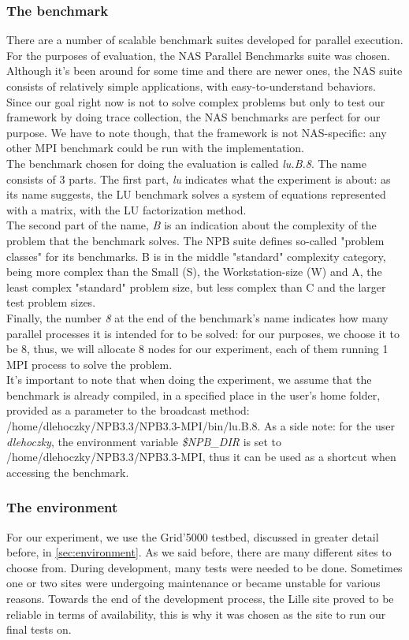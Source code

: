 \subsubsection{The benchmark}
There are a number of scalable benchmark suites developed for parallel
execution. For the purposes of evaluation, the NAS Parallel Benchmarks
suite\cite{jfy99} was chosen. Although it's been around for some time
and there are newer ones, the NAS suite consists of relatively simple
applications, with easy-to-understand behaviors. Since our goal right
now is not to solve complex problems but only to test our framework by
doing trace collection, the NAS benchmarks are perfect for our
purpose. We have to note though, that the framework is not
NAS-specific: any other MPI benchmark could be run with the
implementation.\\[0.3cm]
The benchmark chosen for doing the evaluation is
called \emph{lu.B.8}. The name consists of 3 parts. The first
part, \emph{lu} indicates what the experiment is about: as its name
suggests, the LU benchmark solves a system of equations represented
with a matrix, with the LU factorization method.\\[0.3cm]
The second part of the name, \emph{B} is an
indication about the complexity of the problem that the benchmark
solves. The NPB suite defines so-called "problem classes" for its
benchmarks. B is in the middle "standard" complexity category, being
more complex than the Small (S), the Workstation-size (W) and A, the
least complex "standard" problem size, but less complex than C and the
larger test problem sizes.\cite{d13}\\[0.3cm]
Finally, the number \emph{8} at the end of the benchmark's name
indicates how many parallel processes it is intended for to be solved:
for our purposes, we choose it to be 8, thus, we will allocate 8 nodes
for our experiment, each of them running 1 MPI process to solve the
problem.\\[0.3cm]
It's important to note that when doing the experiment, we assume that
the benchmark is already compiled, in a specified place in the user's
home folder, provided as a parameter to the broadcast method:
/home/dlehoczky/NPB3.3/NPB3.3-MPI/bin/lu.B.8. As a side note: for the
user \emph{dlehoczky}, the environment variable \emph{\$NPB\_DIR} is
set to /home/dlehoczky/NPB3.3/NPB3.3-MPI, thus it can be used as a
shortcut when accessing the benchmark.
\subsubsection{The environment}
For our experiment, we use the Grid'5000 testbed, discussed in greater
detail before, in \ref{sec:environment}. As we said before, there are
many different sites to choose from. During development,
many tests were needed to be done. Sometimes one or two sites were
undergoing maintenance or became unstable for various reasons. Towards
the end of the development process, the Lille site proved to be
reliable in terms of availability, this is why it was chosen as the
site to run our final tests on.
